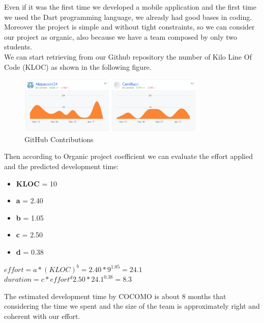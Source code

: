Even if it was the first time we developed a mobile application and the first time we used the Dart programming language, we already had good bases in coding.
Moreover the project is simple and without tight constraints, so we can consider our project as organic, also because we have a team composed by only two students.\\
We can start retrieving from our Github repository the number of Kilo Line Of Code (KLOC) as shown in the following figure.\\
\begin{figure}[H]
		\begin{center}
			\centering
			\includegraphics[width=0.8\textwidth]{img/RepoInsights.png}
			\caption{GitHub Contributions}
		\end{center}
	\end{figure}
Then according to Organic project coefficient we can evaluate the effort applied and the predicted development time:

\begin{itemize}
	\item \textbf{KLOC} = 10
	\item \textbf{a} = 2.40
	\item \textbf{b} = 1.05
	\item \textbf{c} = 2.50
	\item \textbf{d} = 0.38
\end{itemize}

\begin{center}
$ effort = a * (KLOC)^{b} = 2.40 * 9^{1.05} = 24.1 $\\
$ duration = c * effort^{d} 2.50 * 24.1 ^{0.38} = 8.3 $\\
\end{center}

The estimated development time by COCOMO is about 8 months that considering the time we spent and the size of the team is approximately right and coherent with our effort.  